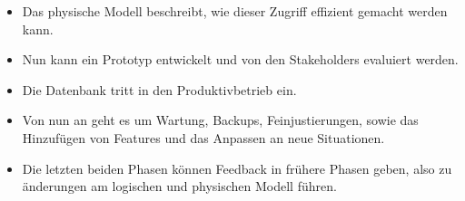 \documentclass[aspectratio=169,mathserif,notheorems]{beamer}%
\begin{document}
\begin{frame}[t]
{{\begin{itemize}
{}%
%
%
%
%
%
%
%
\item<19-> Das physische Modell beschreibt, wie dieser Zugriff effizient gemacht werden kann.%
%
\item<20-> Nun kann ein Prototyp entwickelt und von den Stakeholders evaluiert werden.%
%
\item<21-> Die Datenbank tritt in den Produktivbetrieb ein.%
%
\item<22-> Von nun an geht es um Wartung, Backups, Feinjustierungen, sowie das Hinzufügen von Features und das Anpassen an neue Situationen.%
%
\item<23-> Die letzten beiden Phasen können Feedback in frühere Phasen geben, also zu änderungen am logischen und physischen Modell führen.%
%
\end{itemize}}}%
%
%
%
\end{frame}%
\end{document}

